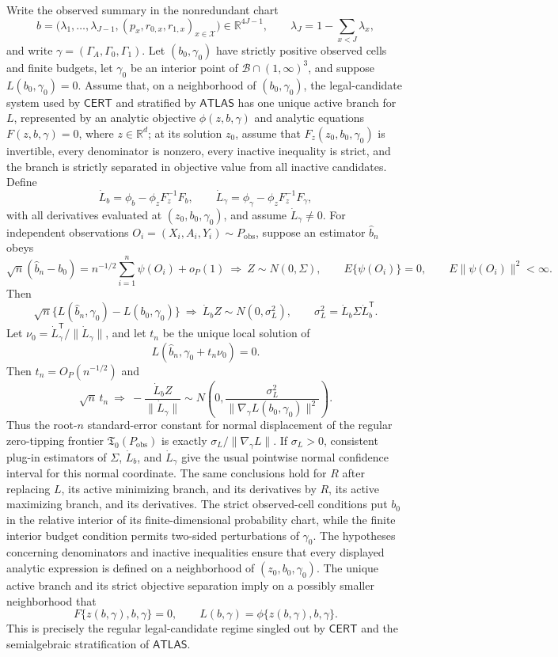 Write the observed summary in the nonredundant chart
\[
b=\bigl(\lambda_1,\ldots,\lambda_{J-1},(p_x,r_{0,x},r_{1,x})_{x\in\mathcal X}\bigr)\in\mathbb R^{4J-1},
\qquad
\lambda_J=1-\sum_{x<J}\lambda_x,
\]
and write \(\gamma=(\Gamma_A,\Gamma_0,\Gamma_1)\).  Let \((b_0,\gamma_0)\) have strictly positive observed cells and finite budgets, let \(\gamma_0\) be an interior point of \(\mathcal B\cap(1,\infty)^3\), and suppose \(L(b_0,\gamma_0)=0\).  Assume that, on a neighborhood of \((b_0,\gamma_0)\), the legal-candidate system used by \(\mathsf{CERT}\) and stratified by \(\mathsf{ATLAS}\) has one unique active branch for \(L\), represented by an analytic objective \(\phi(z,b,\gamma)\) and analytic equations \(F(z,b,\gamma)=0\), where \(z\in\mathbb R^d\); at its solution \(z_0\), assume that \(F_z(z_0,b_0,\gamma_0)\) is invertible, every denominator is nonzero, every inactive inequality is strict, and the branch is strictly separated in objective value from all inactive candidates.  Define
\[
\dot L_b=\phi_b-\phi_zF_z^{-1}F_b,
\qquad
\dot L_\gamma=\phi_\gamma-\phi_zF_z^{-1}F_\gamma,
\]
with all derivatives evaluated at \((z_0,b_0,\gamma_0)\), and assume \(\dot L_\gamma\neq0\).  For independent observations \(O_i=(X_i,A_i,Y_i)\sim P_{\mathrm{obs}}\), suppose an estimator \(\widehat b_n\) obeys
\[
\sqrt n(\widehat b_n-b_0)
=n^{-1/2}\sum_{i=1}^n\psi(O_i)+o_P(1)
\ \Longrightarrow\ Z\sim N(0,\Sigma),
\qquad
E\{\psi(O_i)\}=0,
\qquad
E\|\psi(O_i)\|^2<\infty.
\]
Then
\[
\sqrt n\{L(\widehat b_n,\gamma_0)-L(b_0,\gamma_0)\}
\ \Longrightarrow\ \dot L_bZ
\sim N(0,\sigma_L^2),
\qquad
\sigma_L^2=\dot L_b\Sigma\dot L_b^{\mathsf T}.
\]
Let \(\nu_0=\dot L_\gamma^{\mathsf T}/\|\dot L_\gamma\|\), and let \(t_n\) be the unique local solution of
\[
L(\widehat b_n,\gamma_0+t_n\nu_0)=0.
\]
Then \(t_n=O_P(n^{-1/2})\) and
\[
\sqrt n\,t_n
\ \Longrightarrow\
-\frac{\dot L_bZ}{\|\dot L_\gamma\|}
\sim N\!\left(0,\frac{\sigma_L^2}{\|\nabla_\gamma L(b_0,\gamma_0)\|^2}\right).
\]
Thus the root-\(n\) standard-error constant for normal displacement of the regular zero-tipping frontier \(\mathfrak T_0(P_{\mathrm{obs}})\) is exactly \(\sigma_L/\|\nabla_\gamma L\|\).  If \(\sigma_L>0\), consistent plug-in estimators of \(\Sigma\), \(\dot L_b\), and \(\dot L_\gamma\) give the usual pointwise normal confidence interval for this normal coordinate.  The same conclusions hold for \(R\) after replacing \(L\), its active minimizing branch, and its derivatives by \(R\), its active maximizing branch, and its derivatives.
The strict observed-cell conditions put \(b_0\) in the relative interior of its finite-dimensional probability chart, while the finite interior budget condition permits two-sided perturbations of \(\gamma_0\).  The hypotheses concerning denominators and inactive inequalities ensure that every displayed analytic expression is defined on a neighborhood of \((z_0,b_0,\gamma_0)\).  The unique active branch and its strict objective separation imply on a possibly smaller neighborhood that
\[
F\{z(b,\gamma),b,\gamma\}=0,
\qquad
L(b,\gamma)=\phi\{z(b,\gamma),b,\gamma\}.
\tag{1}
\]
This is precisely the regular legal-candidate regime singled out by \(\mathsf{CERT}\) and the semialgebraic stratification of \(\mathsf{ATLAS}\).

